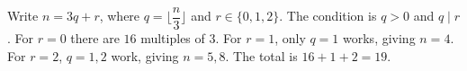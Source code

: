 Write $n=3q+r$, where $q=\lfloor \dfrac{n}{3}\rfloor$ and $r\in\{0,1,2\}$. The condition is $q>0$ and $q\mid r$. For $r=0$ there are $16$ multiples of $3$. For $r=1$, only $q=1$ works, giving $n=4$. For $r=2$, $q=1,2$ work, giving $n=5,8$. The total is $16+1+2=\boxed{19}$.

